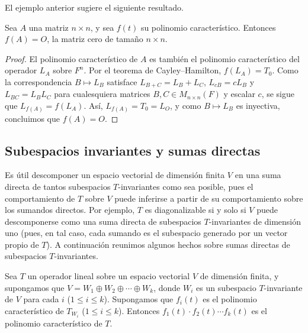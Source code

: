 \documentclass[12pt,a4paper]{book}
\begin{document}
    El ejemplo anterior sugiere el siguiente resultado.

    \begin{corolario}
        Sea $A$ una matriz $n\times n$, y sea $f(t)$ su polinomio característico. Entonces $f(A)=O$, la matriz cero de tamaño $n\times n$.
    \end{corolario}

    \begin{proof}
        El polinomio característico de $A$ es también el polinomio característico del operador $L_A$ sobre $F^n$. Por el teorema de Cayley--Hamilton, $f(L_A)=T_0$. Como la correspondencia $B\mapsto L_B$ satisface $L_{B+C}=L_B+L_C$, $L_{cB}=cL_B$ y $L_{BC}=L_BL_C$ para cualesquiera matrices $B,C\in M_{n\times n}(F)$ y escalar $c$, se sigue que $L_{f(A)}=f(L_A)$. Así, $L_{f(A)}=T_0=L_O$, y como $B\mapsto L_B$ es inyectiva, concluimos que $f(A)=O$.
    \end{proof}

    \subsection*{Subespacios invariantes y sumas directas}

    Es útil descomponer un espacio vectorial de dimensión finita $V$ en una suma directa de tantos subespacios $T$-invariantes como sea posible, pues el comportamiento de $T$ sobre $V$ puede inferirse a partir de su comportamiento sobre los sumandos directos. Por ejemplo, $T$ es diagonalizable si y solo si $V$ puede descomponerse como una suma directa de subespacios $T$-invariantes de dimensión uno (pues, en tal caso, cada sumando es el subespacio generado por un vector propio de $T$). A continuación reunimos algunos hechos sobre sumas directas de subespacios $T$-invariantes.

    \begin{teorema}
        Sea $T$ un operador lineal sobre un espacio vectorial $V$ de dimensión finita, y supongamos que $V=W_1\oplus W_2\oplus\cdots\oplus W_k$, donde $W_i$ es un subespacio $T$-invariante de $V$ para cada $i$ ($1\leq i\leq k$). Supongamos que $f_i(t)$ es el polinomio característico de $T_{W_i}$ ($1\leq i\leq k$). Entonces $f_1(t)\cdot f_2(t)\cdots f_k(t)$ es el polinomio característico de $T$.
    \end{teorema}
\end{document}
